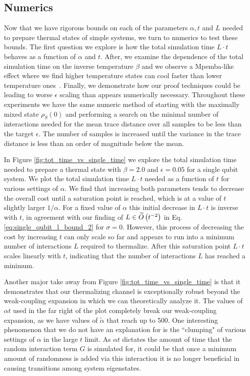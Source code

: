 \subsection{Numerics} \label{sec:specific_numerics}
Now that we have rigorous bounds on each of the parameters $\alpha, t$ and $L$ needed to prepare thermal states of simple systems, we turn to numerics to test these bounds. The first question we explore is how the total simulation time $L \cdot t$ behaves as a function of $\alpha$ and $t$. After, we examine the dependence of the total simulation time on the inverse temperature $\beta$ and we observe a Mpemba-like effect where we find higher temperature states can cool faster than lower temperature ones~\cite{auerbach1995supercooling}. Finally, we demonstrate how our proof techniques could be leading to worse $\epsilon$ scaling than appears numerically necessary. Throughout these experiments we have the same numeric method of starting with the maximally mixed state $\rho_S(0)$ and performing a search on the minimal number of interactions needed for the mean trace distance over all samples to be less than the target $\epsilon$. The number of samples is increased until the variance in the trace distance is less than an order of magnitude below the mean.

In Figure \ref{fig:tot_time_vs_single_time} we explore the total simulation time needed to prepare a thermal state with $\beta = 2.0$ and $\epsilon = 0.05$ for a single qubit system. We plot the total simulation time $L \cdot t$ needed as a function of $t$ for various settings of $\alpha$. We find that increasing both parameters tends to decrease the overall cost until a saturation point is reached, which is at a value of $t$ slightly larger $1/\alpha$. For a fixed value of $\alpha$ this initial decrease in $L \cdot t$ is inverse with $t$, in agreement with our finding of $L \in \widetilde{O} \left( t^{-2} \right)$ in Eq. \eqref{eq:single_qubit_l_bound_2} for $\sigma = 0$. However, this process of decreasing the cost by increasing $t$ can only scale so far and appears to run into a minimum number of interactions $L$ required to thermalize. After this saturation point $L \cdot t$ scales linearly with $t$, indicating that the number of interactions $L$ has reached a minimum. 

Another major take away from Figure \ref{fig:tot_time_vs_single_time} is that it demonstrates that our thermalizing channel is exceptionally robust beyond the weak-coupling expansion in which we can theoretically analyze it. The values of $\alpha t$ used in the far right of the plot completely break our weak-coupling expansion, as we have values of $\widetilde{\alpha}$ that reach up to 500. One interesting phenomenon that we do not have an explanation for is the ``clumping" of various settings of $\alpha$ in the large $t$ limit. As $\alpha t$ dictates the amount of time that the random interaction term $G$ is simulated for, it could be that once a minimum amount of randomness is added via this interaction it is no longer beneficial in causing transitions among system eigenstates. 

